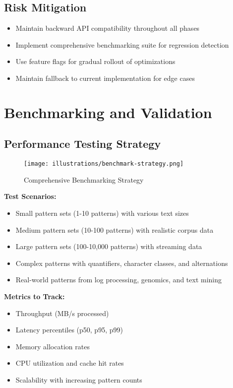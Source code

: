 \documentclass[11pt,a4paper]{article}
\begin{document}
\subsection{Risk Mitigation}

\begin{itemize}
\item Maintain backward API compatibility throughout all phases
\item Implement comprehensive benchmarking suite for regression detection
\item Use feature flags for gradual rollout of optimizations
\item Maintain fallback to current implementation for edge cases
\end{itemize}

\section{Benchmarking and Validation}

\subsection{Performance Testing Strategy}

\begin{figure}[htbp]
\centering
\texttt{[image: illustrations/benchmark-strategy.png]}
\caption{Comprehensive Benchmarking Strategy}
\label{fig:benchmark}
\end{figure}

\textbf{Test Scenarios:}
\begin{itemize}
\item Small pattern sets (1-10 patterns) with various text sizes
\item Medium pattern sets (10-100 patterns) with realistic corpus data  
\item Large pattern sets (100-10,000 patterns) with streaming data
\item Complex patterns with quantifiers, character classes, and alternations
\item Real-world patterns from log processing, genomics, and text mining
\end{itemize}

\textbf{Metrics to Track:}
\begin{itemize}
\item Throughput (MB/s processed)
\item Latency percentiles (p50, p95, p99)
\item Memory allocation rates
\item CPU utilization and cache hit rates
\item Scalability with increasing pattern counts
\end{itemize}
\end{document}
